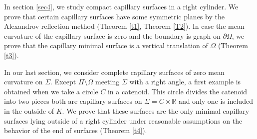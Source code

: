 \documentclass[12pt,a4paper]{amsart}
\begin{document}
In section \ref{sec4}, we study compact capillary surfaces in a right cylinder.  We prove that certain capillary surfaces have some symmetric planes by the Alexandrov reflection method (Theorem \ref{t1}, Theorem \ref{T2}). In case the mean curvature of the capillary surface is zero and the boundary is graph on $\partial\Omega$, we prove that the capillary minimal surface is a vertical translation of $\Omega$ (Theorem \ref{t3}).

In our last section, we consider complete capillary surfaces of zero mean curvature on $\Sigma$. Except $\Pi\setminus\Omega$ meeting $\Sigma$ with a right angle, a first example is obtained when we take a circle $C$ in a catenoid. This circle divides the catenoid into two pieces both are capillary surfaces on $\Sigma=C\times{\mathbb R}$ and only one is included in the outside of $K$.
We prove that these surfaces are the only minimal capillary surfaces lying outside of a right cylinder under reasonable assumptions on the behavior of the end of surfaces (Theorem \ref{t4}).
\end{document}
